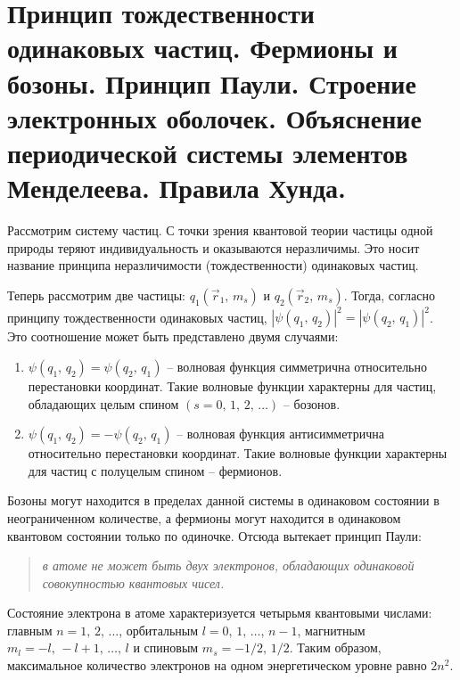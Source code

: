 \newcommand{\up}{\uparrow}
\newcommand{\down}{\downarrow}
\newcommand{\updown}{\up\down}

\chapter{Принцип тождественности одинаковых частиц. Фермионы и бозоны. 
Принцип Паули. Строение электронных оболочек. Объяснение периодической 
системы элементов Менделеева. Правила Хунда.}

Рассмотрим систему частиц. С точки зрения квантовой теории частицы одной природы
теряют индивидуальность и оказываются неразличимы. Это носит название принципа
неразличимости (тождественности) одинаковых частиц.

Теперь рассмотрим две частицы: \( q_1(\vec{r}_1,\,m_s) \) и \( q_2(\vec{r}_2,\,
m_s) \). Тогда, согласно принципу тождественности одинаковых частиц,
\( |\psi(q_1,\,q_2)|^2 = |\psi(q_2,\,q_1)|^2 \). Это соотношение может быть
представлено двумя случаями:
\begin{enumerate}
    \item \( \psi(q_1,\,q_2) = \psi(q_2,\,q_1) \) -- волновая функция
    симметрична относительно перестановки координат. Такие волновые функции
    характерны для частиц, обладающих целым спином \( (s = 0,\,1,\,2,\,\ldots)
    \) -- бозонов.
    
    \item \( \psi(q_1,\,q_2) = -\psi(q_2,\,q_1) \) -- волновая функция
    антисимметрична относительно перестановки координат. Такие волновые функции
    характерны для частиц с полуцелым спином -- фермионов.
\end{enumerate}

Бозоны могут находится в пределах данной системы в одинаковом состоянии в
неограниченном количестве, а фермионы могут находится в одинаковом квантовом
состоянии только по одиночке. Отсюда вытекает принцип Паули:

\begin{quote}
\emph{в атоме не может быть двух электронов, обладающих одинаковой
совокупностью квантовых чисел.}
\end{quote}

Состояние электрона в атоме характеризуется четырьмя квантовыми числами: главным
\( n = 1,\,2,\,\ldots \), орбитальным \( l = 0,\,1,\,\ldots,\,n - 1 \),
магнитным \( m_l = -l,\,-l + 1,\,\ldots,\, l \) и спиновым \( m_s = -1/2,\,
1/2 \). Таким образом, максимальное количество электронов на одном
энергетическом уровне равно \( 2n^2 \).

